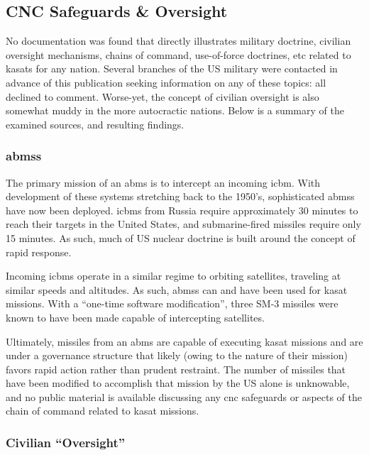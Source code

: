 \subsection{CNC Safeguards \& Oversight}

No documentation was found that directly illustrates military
doctrine, civilian oversight mechanisms, chains of command,
use-of-force doctrines, etc related to \acp{kasat} for any nation.
Several branches of the US military were contacted in advance of this
publication seeking information on any of these topics: all declined
to comment.  Worse-yet, the concept of civilian oversight is also
somewhat muddy in the more autocractic nations.  Below is a summary of
the examined sources, and resulting findings.


\subsubsection{\acfp{abms}}

The primary mission of an \acf{abms} is to intercept an incoming
\ac{icbm}.  With development of these systems stretching back to the
1950's\cite[p01-10]{brian}, sophisticated \acp{abms} have now been
deployed.\cite[p01-15]{brian} \acp{icbm} from Russia require
approximately 30 minutes to reach their targets in the United States,
and submarine-fired missiles require only 15 minutes.\cite{cnc-primer}
As such, much of US nuclear doctrine is built around the concept of
rapid response.\cite{cnc-primer}

Incoming \acp{icbm} operate in a similar regime to orbiting
satellites, traveling at similar speeds and
altitudes.\cite[p01-15]{brian} As such, \acp{abms} can and have been
used for \ac{kasat} missions.  With a ``one-time software
modification'', three SM-3 missiles were known to have been made
capable of intercepting satellites.\cite[p01-15]{brian}

Ultimately, missiles from an \ac{abms} are capable of executing
\ac{kasat} missions and are under a governance structure that likely
(owing to the nature of their mission) favors rapid action rather than
prudent restraint.  The number of missiles that have been modified to
accomplish that mission by the US alone is unknowable, and no public
material is available discussing any \ac{cnc} safeguards or aspects of
the chain of command related to \ac{kasat} missions.

\subsubsection{Civilian ``Oversight''}

